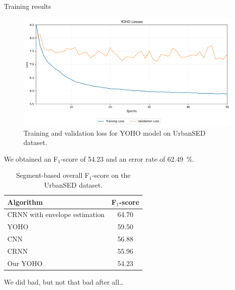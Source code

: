 	\begin{frame}[allowframebreaks]{Training results}

		\begin{figure}
			\centering
			\includegraphics[width=.7\textwidth]{images/losses.png}
			\caption{Training and validation loss for YOHO model on UrbanSED dataset.}
			\label{fig:trainingLosses}
		\end{figure}

	\framebreak

		We obtained an F$_{1}$-score of \SI{54.23}{} and an error rate of \SI{62.49}{\percent}.

		\begin{table}[h!]
    		\centering
    		\begin{tabular}{||l|c||}
        		\hline
        		\textbf{Algorithm} & \textbf{F$_{1}$-score} \\
        		\hline
        		CRNN with envelope estimation & 64.70 \\
        		\rowcolor{UNITSIceBlue!50} 
        		YOHO & 59.50 \\
        		CNN & 56.88 \\
        		CRNN & 55.96 \\
        		\rowcolor{UNITSIceBlue!50} 
        		Our YOHO & 54.23 \\
        		\hline
    		\end{tabular}
    		\caption{Segment-based overall F$_{1}$-score on the UrbanSED dataset.}
    		\label{tab:performance}
		\end{table}

		We did bad, but not that bad after all\dots

	\end{frame}
